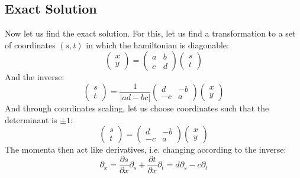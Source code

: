 \documentclass{article}
\begin{document}
\subsection{Exact Solution}
Now let us find the exact solution. For this, let us find a transformation to a set of coordinates $(s, t)$ in which the hamiltonian is diagonable:
\begin{equation}
    \begin{pmatrix}
        x \\ y
    \end{pmatrix} = \begin{pmatrix}
        a & b \\ c & d
    \end{pmatrix} \begin{pmatrix}
        s \\ t
    \end{pmatrix}
\end{equation}
And the inverse:
\begin{equation} \begin{pmatrix}
        s \\ t
    \end{pmatrix} = \frac{1}{|ad - bc|}\begin{pmatrix}
        d & -b \\ -c & a
    \end{pmatrix}
    \begin{pmatrix}
        x \\ y
    \end{pmatrix}
\end{equation}
And through coordinates scaling, let us choose coordinates such that the determinant is $\pm 1$:
\begin{equation} \begin{pmatrix}
        s \\ t
    \end{pmatrix} = \begin{pmatrix}
        d & -b \\ -c & a
    \end{pmatrix}
    \begin{pmatrix}
        x \\ y
    \end{pmatrix}
\end{equation}
The momenta then act like derivatives, i.e. changing according to the inverse:
\begin{equation}
    \partial_x = \frac{\partial s}{\partial x} \partial_s + \frac{\partial t}{\partial x} \partial_t = d \partial_s - c\partial_t
\end{equation}
\end{document}
